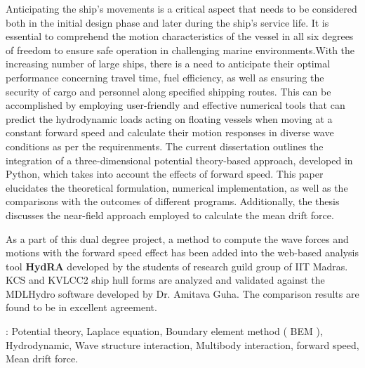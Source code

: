 \abstract
Anticipating the ship's movements is a critical aspect that needs to be considered both in 
the initial design phase and later during the ship's service life. It is essential to 
comprehend the motion characteristics of the vessel in all six degrees of freedom to 
ensure safe operation in challenging marine environments.With the increasing number of large ships,
there is a need to anticipate their optimal performance concerning travel time, fuel efficiency, 
as well as ensuring the security of cargo and personnel along specified shipping routes. 
This can be accomplished by employing user-friendly and effective numerical tools that can 
predict the hydrodynamic loads acting on floating vessels when moving at a constant forward 
speed and calculate their motion responses in diverse wave conditions as per the requirenments. 
The current dissertation outlines the integration of a three-dimensional potential theory-based 
approach, developed in Python, which takes into account the effects of forward speed. 
This paper elucidates the theoretical formulation, numerical implementation, as well as the 
comparisons with the outcomes of different programs. Additionally, the thesis discusses the 
near-field approach employed to calculate the mean drift force.

As a part of this dual degree project, a method to compute the wave forces and motions with 
the forward speed effect has been added into the web-based analysis tool {\bf HydRA} developed by 
the students of research guild group of IIT Madras. KCS and KVLCC2 ship hull forms are analyzed 
and validated against the MDLHydro software developed by Dr. Amitava Guha. 
The comparison results are found to be in excellent agreement.

 : Potential theory, Laplace equation, Boundary element method ( BEM ), 
Hydrodynamic, Wave structure interaction, Multibody interaction, forward speed, Mean drift force.